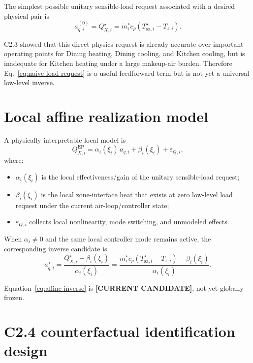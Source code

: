 \documentclass[11pt]{article}
\newcommand{\mdot}{\dot m}
\newcommand{\Candidate}{\textbf{[CURRENT CANDIDATE]}}
\begin{document}
The simplest possible unitary sensible-load request associated with a desired
physical pair is
\begin{equation}
a_{q,i}^{(0)}
=
Q_{X,i}^\star
=
\mdot_i^\star c_p
\left(
T_{\mathrm{sa},i}^\star-T_{z,i}
\right).
\label{eq:naive-load-request}
\end{equation}

C2.3 showed that this direct physics request is already accurate over important
operating points for Dining heating, Dining cooling, and Kitchen cooling, but
is inadequate for Kitchen heating under a large makeup-air burden.  Therefore
Eq.~\eqref{eq:naive-load-request} is a useful feedforward term but is not yet a
universal low-level inverse.

\section{Local affine realization model}

A physically interpretable local model is
\begin{equation}
\boxed{
Q_{X,i}^{\mathrm{EP}}
=
\alpha_i(\xi_i)\,a_{q,i}
+
\beta_i(\xi_i)
+
\varepsilon_{Q,i},
}
\label{eq:local-affine}
\end{equation}
where:
\begin{itemize}[leftmargin=2em]
\item $\alpha_i(\xi_i)$ is the local effectiveness/gain of the unitary
sensible-load request;
\item $\beta_i(\xi_i)$ is the local zone-interface heat that exists at zero
low-level load request under the current air-loop/controller state;
\item $\varepsilon_{Q,i}$ collects local nonlinearity, mode switching, and
unmodeled effects.
\end{itemize}

When $\alpha_i\neq 0$ and the same local controller mode remains active, the
corresponding inverse candidate is
\begin{equation}
\boxed{
a_{q,i}^\star
=
\frac{
Q_{X,i}^\star-\beta_i(\xi_i)
}{
\alpha_i(\xi_i)
}
=
\frac{
\mdot_i^\star c_p(T_{\mathrm{sa},i}^\star-T_{z,i})
-\beta_i(\xi_i)
}{
\alpha_i(\xi_i)
}.
}
\label{eq:affine-inverse}
\end{equation}

Equation~\eqref{eq:affine-inverse} is \Candidate, not yet globally frozen.

\section{C2.4 counterfactual identification design}
\end{document}
